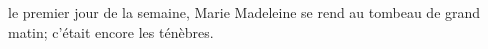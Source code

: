 \encetemps le premier jour de la semaine,
	Marie Madeleine se rend au tombeau de grand matin;
	c’était encore les ténèbres.
